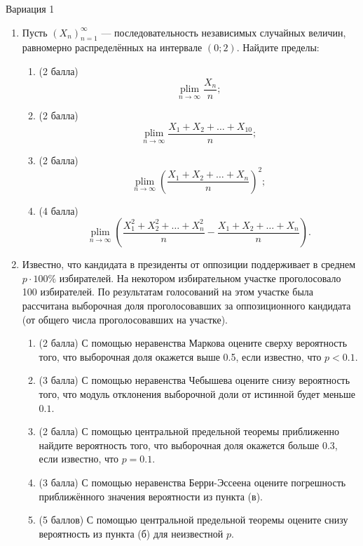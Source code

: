\documentclass[12pt]{article}
\DeclareMathOperator*{\plim}{plim}
\begin{document}
Вариация 1

\begin{enumerate}
\item Пусть $(X_n)_{n=1}^{\infty}$ — последовательность независимых случайных величин, равномерно распределённых на интервале $(0; 2)$. 
Найдите пределы:

\begin{enumerate}
    \item (2 балла) 
    \[
        \plim\limits_{n\to\infty} \frac{X_n}{n};
    \]
    \item (2 балла) 
    \[ 
        \plim\limits_{n\to\infty} \frac{X_1 + X_2 + \ldots + X_{10}}{n};
    \]
    \item (2 балла) 
    \[
         \plim\limits_{n\to\infty} \left(\frac{X_1 + X_2 + \ldots + X_n}{n}\right)^2;
         \]
    
    \item (4 балла) 
    \[
         \plim\limits_{n\to\infty} \left(\frac{X_1^2 + X_2^2 + \ldots + X_{n}^2}{n} - \frac{X_1 + X_2 + \ldots + X_{n}}{n}\right).
         \]
\end{enumerate}

\item Известно, что кандидата в президенты от оппозиции поддерживает в среднем $p\cdot 100\%$ избирателей. 
На некотором избирательном участке проголосовало 100 избирателей. 
По результатам голосований на этом участке была рассчитана выборочная доля проголосовавших 
за оппозиционного кандидата (от общего числа проголосовавших на участке).

\begin{enumerate}
    \item (2 балла) С помощью неравенства Маркова оцените сверху вероятность того, 
    что выборочная доля окажется выше 0.5, если известно, что $p<0.1$.
    \item (3 балла) С помощью неравенства Чебышева оцените снизу вероятность того, 
    что модуль отклонения выборочной доли от истинной будет меньше $0.1$.
    \item (2 балла) С помощью центральной предельной теоремы приближенно найдите вероятность того, 
    что выборочная доля окажется больше 0.3, если известно, что $p=0.1$.
    \item (3 балла) С помощью неравенства Берри-Эссеена оцените погрешность приближённого значения вероятности из пункта (в).
    \item (5 баллов) С помощью центральной предельной теоремы оцените снизу вероятность из пункта (б) для неизвестной $p$.
\end{enumerate}

\end{enumerate}
\end{document}
